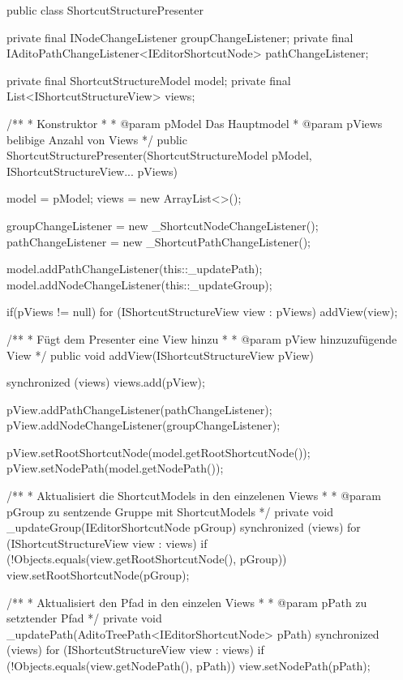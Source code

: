 \vspace{-5px}
  \begin{spacing}{0.75}
    \begin{javacode}[firstnumber=21]
public class ShortcutStructurePresenter
{
  private final INodeChangeListener groupChangeListener;
  private final IAditoPathChangeListener<IEditorShortcutNode> pathChangeListener;
  
  private final ShortcutStructureModel model;
  private final List<IShortcutStructureView> views;
  
  /**
  * Konstruktor
  *
  * @param pModel Das Hauptmodel
  * @param pViews belibige Anzahl von Views
  */
  public ShortcutStructurePresenter(ShortcutStructureModel pModel, IShortcutStructureView... pViews)
  {
    model = pModel;
    views = new ArrayList<>();
    
    groupChangeListener = new _ShortcutNodeChangeListener();
    pathChangeListener = new _ShortcutPathChangeListener();
    
    model.addPathChangeListener(this::_updatePath);
    model.addNodeChangeListener(this::_updateGroup);
    
    if(pViews != null)
      for (IShortcutStructureView view : pViews)
        addView(view);
  }
  
  /**
  * Fügt dem Presenter eine View hinzu
  *
  * @param pView hinzuzufügende View
  */
  public void addView(IShortcutStructureView pView)
  {
    synchronized (views)
    {
      views.add(pView);
    }
    
    pView.addPathChangeListener(pathChangeListener);
    pView.addNodeChangeListener(groupChangeListener);
    
    pView.setRootShortcutNode(model.getRootShortcutNode());
    pView.setNodePath(model.getNodePath());
  }
  
  /**
  * Aktualisiert die ShortcutModels in den einzelenen Views
  *
  * @param pGroup zu sentzende Gruppe mit ShortcutModels
  */
  private void _updateGroup(IEditorShortcutNode pGroup)
  {
    synchronized (views)
    {
      for (IShortcutStructureView view : views)
      if (!Objects.equals(view.getRootShortcutNode(), pGroup))
      view.setRootShortcutNode(pGroup);
    }
  }
  
  /**
  * Aktualisiert den Pfad in den einzelen Views
  *
  * @param pPath zu setztender Pfad
  */
  private void _updatePath(AditoTreePath<IEditorShortcutNode> pPath)
  {
    synchronized (views)
    {
      for (IShortcutStructureView view : views)
      if (!Objects.equals(view.getNodePath(), pPath))
      view.setNodePath(pPath);
    }
  }
  
}
\end{javacode}
\end{spacing}
